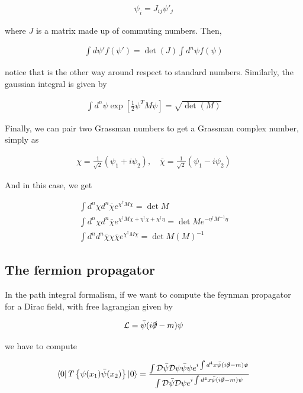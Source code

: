 \documentclass{report}
\begin{document}
\begin{align}
    \psi_i = J_{ij}\psi'_j 
\end{align}

where \(J\) is a matrix made up of commuting numbers. Then, 

\begin{align}
    \int d\psi' f(\psi') = \det(J)\int d^n \psi f(\psi)
\end{align}

notice that is the other way around respect to standard numbers. Similarly, the gaussian integral is given by

\begin{align}
    \int d^n \psi \exp\left[\frac{1}{2}\psi^T M \psi\right] = \sqrt{\det(M)}
\end{align}

Finally, we can pair two Grassman numbers to get a Grassman complex number, simply as 

\begin{align}
    \chi = \frac{1}{\sqrt{2}}(\psi_1 + i\psi_2), \quad \bar{\chi} = \frac{1}{\sqrt{2}}(\psi_1 - i\psi_2)
\end{align}

And in this case, we get 

\begin{align}
    \int d^n \chi d^n \bar{\chi} e^{\chi^\dagger M \chi} = \det M \\
    \int d^n \chi d^n \bar{\chi} e^{\chi^\dagger M \chi + \eta^\dagger \chi + \chi^\dagger \eta} = \det M e^{-\eta^\dagger M^{-1}\eta} \\
    \int d^n d^n \bar{\chi} \chi \bar{\chi} e^{\chi^\dagger M \chi} = \det M (M)^{-1}
\end{align}

\subsection{The fermion propagator}

In the path integral formalism, if we want to compute the feynman propagator for a Dirac field, with free lagrangian given by 

\begin{align}
    \mathcal{L} = \bar{\psi}(i\slashed{\partial}-m)\psi 
\end{align}

we have to compute 

\begin{align}
    \bra{0}T\left\{\psi(x_1)\bar{\psi}(x_2) \right\}\ket{0} = \frac{\int \mathcal{D}\bar{\psi}\mathcal{D}\psi \bar{\psi}\psi e^{i\int d^4x \bar{\psi}(i\slashed{\partial} - m)\psi}}{\int \mathcal{D}\bar{\psi}\mathcal{D}\psi e^{i\int d^4x \bar{\psi}(i\slashed{\partial} - m)\psi}}
\end{align}
\end{document}

